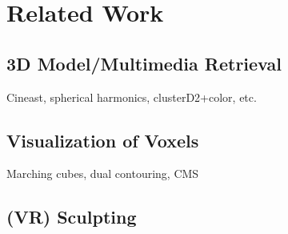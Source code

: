 \chapter{Related Work}

\section{3D Model/Multimedia Retrieval}
Cineast, spherical harmonics, clusterD2+color, etc.

\section{Visualization of Voxels}
Marching cubes, dual contouring, CMS

\section{(VR) Sculpting}